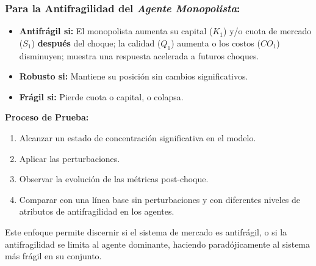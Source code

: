 \documentclass{article}
\begin{document}
\subsubsection{Para la Antifragilidad del \textit{Agente Monopolista}:}
\begin{itemize}
    \item \textbf{Antifrágil si:} El monopolista aumenta su capital ($K_1$) y/o cuota de mercado ($S_1$) \textbf{después} del choque; la calidad ($Q_1$) aumenta o los costos ($CO_1$) disminuyen; muestra una respuesta acelerada a futuros choques.
    \item \textbf{Robusto si:} Mantiene su posición sin cambios significativos.
    \item \textbf{Frágil si:} Pierde cuota o capital, o colapsa.
\end{itemize}

\textbf{Proceso de Prueba:}
\begin{enumerate}
    \item Alcanzar un estado de concentración significativa en el modelo.
    \item Aplicar las perturbaciones.
    \item Observar la evolución de las métricas post-choque.
    \item Comparar con una línea base sin perturbaciones y con diferentes niveles de atributos de antifragilidad en los agentes.
\end{enumerate}
Este enfoque permite discernir si el sistema de mercado es antifrágil, o si la antifragilidad se limita al agente dominante, haciendo paradójicamente al sistema más frágil en su conjunto.
\end{document}
